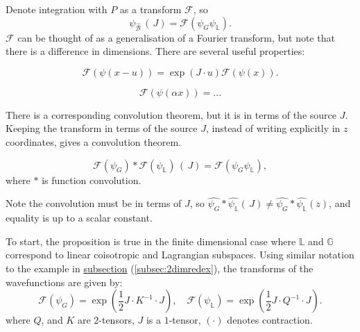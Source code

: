     Denote integration with \(P\) as a transform \( \mathcal{F}\), so
    \[ \psi_{\widehat{\mathcal{B}}}\,(\,J) =  \mathcal{F} ( \psi_G  \psi_{\mathbb{L}}).\]
    \( \mathcal{F}\) can be thought of as a generalisation of a Fourier transform, but note that there is a difference in dimensions. There are several useful properties:
    
    \begin{prop}
    \[ \mathcal{F}(\psi(x-u)) = \exp(J \cdot u) \mathcal{F} (\psi(x)).\]
    \end{prop}
    
    \begin{prop}
    \[ \mathcal{F}(\psi(\alpha x)) = ...\]
    \end{prop}
    
    There is a corresponding convolution theorem, but it is in terms of the source \(J\). Keeping the transform in terms of the source \(J\), instead of writing explicitly in \(z\) coordinates, gives a convolution theorem.
    \begin{prop}
    \[ \mathcal{F}(\psi_G) * \mathcal{F}(\psi_{\mathbb{L}})\, (\, J) =   \mathcal{F}(\psi_G  \psi_{\mathbb{L}}),\]
    where \(*\) is function convolution.
    \end{prop}
    
    
    
    Note the convolution must be in terms of \(J\), so \(\widehat{\psi_G} * \widehat{\psi_{\mathbb{L}}}(\, J) \neq \widehat{\psi_G} * \widehat{\psi_{\mathbb{L}}}(z)\), and equality is up to a scalar constant. 
    
    To start, the proposition is true in the finite dimensional case where \(\mathbb{L}\) and \( \mathbb{G}\) correspond to linear coisotropic and Lagrangian subspaces. Using similar notation to the example in \hyperref[subsec:2dimredex]{subsection} (\ref{subsec:2dimredex}), the transforms of the wavefunctions are given by:
    \[ \mathcal{F}(\psi_G) = \exp\left( \frac{1}{2} J \cdot K^{-1} \cdot J \right) , \quad  \mathcal{F}(\psi_{\mathbb{L}}) = \exp \left( \frac{1}{2} J \cdot Q^{-1} \cdot J \right). \] 
    where \(Q\), and \(K\) are \(2\)-tensors, \(J\) is a \(1\)-tensor, \((\cdot)\) denotes contraction.
    
